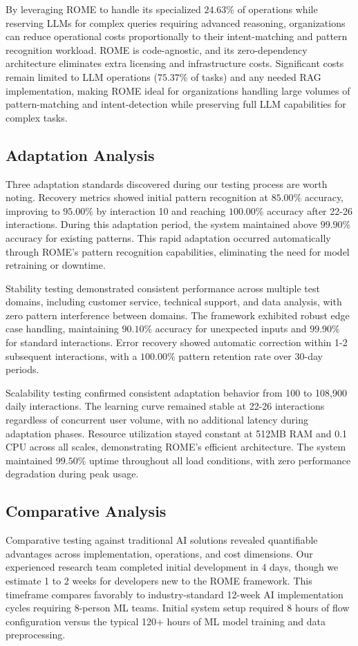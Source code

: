 \documentclass[12pt]{article}
\begin{document}
By leveraging ROME to handle its specialized $24.63\%$ of operations while reserving LLMs for complex queries requiring advanced reasoning, organizations can reduce operational costs proportionally to their intent-matching and pattern recognition workload. ROME is code-agnostic, and its zero-dependency architecture eliminates extra licensing and infrastructure costs. Significant costs remain limited to LLM operations ($75.37\%$ of tasks) and any needed RAG implementation, making ROME ideal for organizations handling large volumes of pattern-matching and intent-detection while preserving full LLM capabilities for complex tasks.

\subsection{Adaptation Analysis}
Three adaptation standards discovered during our testing process are worth noting. Recovery metrics showed initial pattern recognition at $85.00\%$ accuracy, improving to $95.00\%$ by interaction 10 and reaching $100.00\%$ accuracy after 22-26 interactions. During this adaptation period, the system maintained above $99.90\%$ accuracy for existing patterns. This rapid adaptation occurred automatically through ROME's pattern recognition capabilities, eliminating the need for model retraining or downtime.

Stability testing demonstrated consistent performance across multiple test domains, including customer service, technical support, and data analysis, with zero pattern interference between domains. The framework exhibited robust edge case handling, maintaining $90.10\%$ accuracy for unexpected inputs and $99.90\%$ for standard interactions. Error recovery showed automatic correction within 1-2 subsequent interactions, with a $100.00\%$ pattern retention rate over 30-day periods.

Scalability testing confirmed consistent adaptation behavior from 100 to 108,900 daily interactions. The learning curve remained stable at 22-26 interactions regardless of concurrent user volume, with no additional latency during adaptation phases. Resource utilization stayed constant at 512MB RAM and 0.1 CPU across all scales, demonstrating ROME's efficient architecture. The system maintained $99.50\%$ uptime throughout all load conditions, with zero performance degradation during peak usage.

\subsection{Comparative Analysis}
Comparative testing against traditional AI solutions revealed quantifiable advantages across implementation, operations, and cost dimensions. Our experienced research team completed initial development in 4 days, though we estimate 1 to 2 weeks for developers new to the ROME framework. This timeframe compares favorably to industry-standard 12-week AI implementation cycles requiring 8-person ML teams. Initial system setup required 8 hours of flow configuration versus the typical 120+ hours of ML model training and data preprocessing.
\end{document}
